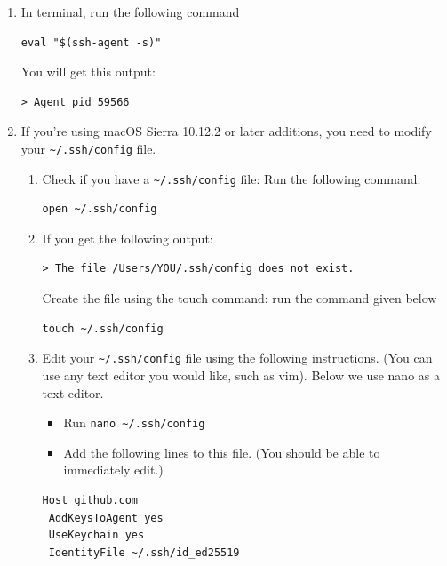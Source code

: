 \documentclass[
]{book}
\providecommand{\tightlist}{%
  \setlength{\itemsep}{0pt}\setlength{\parskip}{0pt}}
\theoremstyle{definition}
\theoremstyle{definition}
\theoremstyle{definition}
\theoremstyle{definition}
\theoremstyle{remark}
\begin{document}
\begin{enumerate}
\def\labelenumi{\arabic{enumi}.}
\item
  In terminal, run the following command

\begin{verbatim}
eval "$(ssh-agent -s)"
\end{verbatim}

  You will get this output:

\begin{verbatim}
> Agent pid 59566
\end{verbatim}
\item
  If you're using macOS Sierra 10.12.2 or later additions, you need to modify your \texttt{\textasciitilde{}/.ssh/config} file.

  \begin{enumerate}
  \def\labelenumii{\arabic{enumii}.}
  \item
    Check if you have a \texttt{\textasciitilde{}/.ssh/config} file: Run the following command:

\begin{verbatim}
open ~/.ssh/config
\end{verbatim}
  \item
    If you get the following output:

\begin{verbatim}
> The file /Users/YOU/.ssh/config does not exist.
\end{verbatim}

    Create the file using the touch command: run the command given below

\begin{verbatim}
touch ~/.ssh/config
\end{verbatim}
  \item
    Edit your \texttt{\textasciitilde{}/.ssh/config} file using the following instructions. (You can use any text editor you would like, such as vim). Below we use nano as a text editor.

    \begin{itemize}
    \tightlist
    \item
      Run \texttt{nano\ \textasciitilde{}/.ssh/config}
    \item
      Add the following lines to this file. (You should be able to immediately edit.)
    \end{itemize}

\begin{verbatim}
Host github.com
 AddKeysToAgent yes
 UseKeychain yes
 IdentityFile ~/.ssh/id_ed25519
\end{verbatim}


\end{enumerate}
\end{enumerate}
\end{document}
